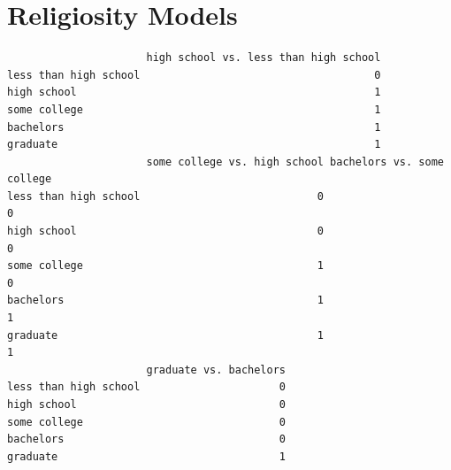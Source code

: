 \documentclass[
  12pt,
  letterpaper,
]{article}
\begin{document}
\hypertarget{religiosity-models}{%
\section{Religiosity Models}\label{religiosity-models}}

\begin{verbatim}
                      high school vs. less than high school
less than high school                                     0
high school                                               1
some college                                              1
bachelors                                                 1
graduate                                                  1
                      some college vs. high school bachelors vs. some college
less than high school                            0                          0
high school                                      0                          0
some college                                     1                          0
bachelors                                        1                          1
graduate                                         1                          1
                      graduate vs. bachelors
less than high school                      0
high school                                0
some college                               0
bachelors                                  0
graduate                                   1
\end{verbatim}
\end{document}
